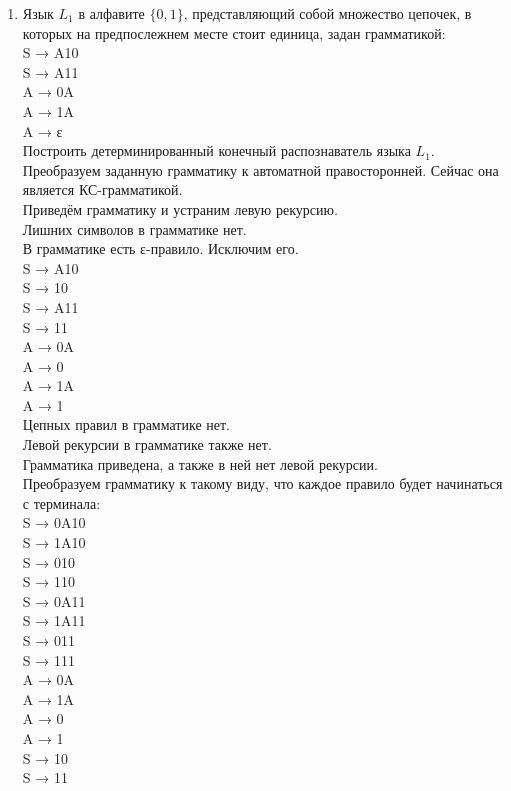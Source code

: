 \documentclass[a4paper,14pt]{extarticle}
\begin{document}
\begin{enumerate}[1.]
    \item Язык $L_1$ в алфавите $\{0,1\}$, представляющий собой множество цепочек, в которых на предпослежнем месте стоит единица, задан грамматикой:\\
    S → A10\\
    S → A11\\
    A → 0A\\
    A → 1A\\
    A → ε\\
    Построить детерминированный конечный распознаватель языка $L_1$.\bigbreak
    Преобразуем заданную грамматику к автоматной правосторонней. Сейчас она является КС-грамматикой.\\
    Приведём грамматику и устраним левую рекурсию.\\
    Лишних символов в грамматике нет.\\
    В грамматике есть ε-правило. Исключим его.\\
    S → A10\\
    S → 10\\
    S → A11\\
    S → 11\\
    A → 0A\\
    A → 0\\
    A → 1A\\
    A → 1\\
    Цепных правил в грамматике нет.\\
    Левой рекурсии в грамматике также нет.\\
    Грамматика приведена, а также в ней нет левой рекурсии.\\ 
    Преобразуем грамматику к такому виду, что каждое 
    правило будет начинаться с терминала:\\ 

S → 0A10\\
S → 1A10\\
S → 010\\
S → 110\\
S → 0A11\\
S → 1A11\\
S → 011\\
S → 111\\
A → 0A\\
A → 1A\\
A → 0\\
A → 1\\
S → 10\\
S → 11\\


\end{enumerate}
\end{document}
